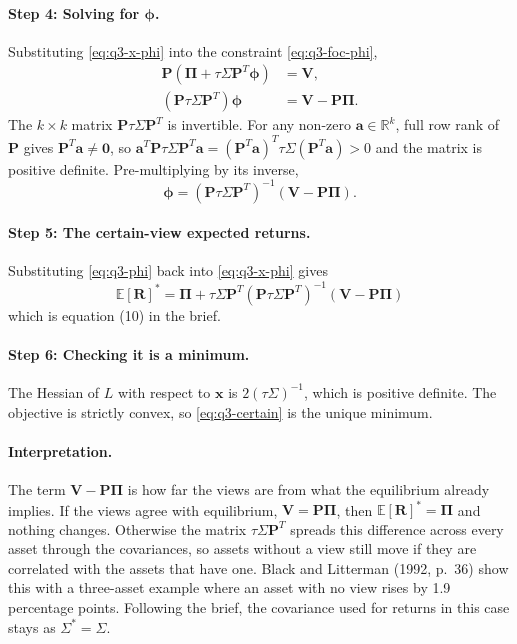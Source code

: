 \documentclass[11pt]{article}
\numberwithin{equation}{section}
\begin{document}
\paragraph{Step 4: Solving for $\bm{\phi}$.}
Substituting \eqref{eq:q3-x-phi} into the constraint \eqref{eq:q3-foc-phi},
\begin{align*}
  \bm{P}\left(\bm{\Pi} + \tau\Sigma\bm{P}^{T}\bm{\phi}\right) &= \bm{V}, \\
  \left(\bm{P}\tau\Sigma\bm{P}^{T}\right)\bm{\phi} &= \bm{V} - \bm{P}\bm{\Pi}.
\end{align*}
The $k \times k$ matrix $\bm{P}\tau\Sigma\bm{P}^{T}$ is invertible. For any non-zero $\bm{a} \in \mathbb{R}^{k}$, full row rank of $\bm{P}$ gives $\bm{P}^{T}\bm{a} \neq \mathbf{0}$, so $\bm{a}^{T}\bm{P}\tau\Sigma\bm{P}^{T}\bm{a} = (\bm{P}^{T}\bm{a})^{T}\tau\Sigma(\bm{P}^{T}\bm{a}) > 0$ and the matrix is positive definite. Pre-multiplying by its inverse,
\begin{equation}
  \bm{\phi} = \left(\bm{P}\tau\Sigma\bm{P}^{T}\right)^{-1}\left(\bm{V} - \bm{P}\bm{\Pi}\right).
  \label{eq:q3-phi}
\end{equation}

\paragraph{Step 5: The certain-view expected returns.}
Substituting \eqref{eq:q3-phi} back into \eqref{eq:q3-x-phi} gives
\begin{equation}
  \boxed{\;\mathbb{E}[\bm{R}]^{*} = \bm{\Pi} + \tau\Sigma\bm{P}^{T}\left(\bm{P}\tau\Sigma\bm{P}^{T}\right)^{-1}\left(\bm{V} - \bm{P}\bm{\Pi}\right)\;}
  \label{eq:q3-certain}
\end{equation}
which is equation (10) in the brief.

\paragraph{Step 6: Checking it is a minimum.}
The Hessian of $L$ with respect to $\bm{x}$ is $2(\tau\Sigma)^{-1}$, which is positive definite. The objective is strictly convex, so \eqref{eq:q3-certain} is the unique minimum.

\paragraph{Interpretation.}
The term $\bm{V} - \bm{P}\bm{\Pi}$ is how far the views are from what the equilibrium already implies. If the views agree with equilibrium, $\bm{V} = \bm{P}\bm{\Pi}$, then $\mathbb{E}[\bm{R}]^{*} = \bm{\Pi}$ and nothing changes. Otherwise the matrix $\tau\Sigma\bm{P}^{T}$ spreads this difference across every asset through the covariances, so assets without a view still move if they are correlated with the assets that have one. Black and Litterman (1992, p.~36) show this with a three-asset example where an asset with no view rises by 1.9 percentage points. Following the brief, the covariance used for returns in this case stays as $\Sigma^{*} = \Sigma$.
\end{document}
